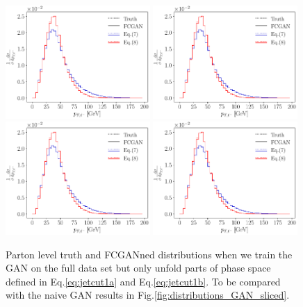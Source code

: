 \begin{figure}[t]
\centering
\includegraphics[page = 2, width=0.49\textwidth]{figures/cGAN/cGAN_overlap_1}
\includegraphics[page = 3, width=0.49\textwidth]{figures/cGAN/cGAN_overlap_1} \\
\includegraphics[page = 1, width=0.49\textwidth]{figures/cGAN/cGAN_overlap_1}
\includegraphics[page = 4, width=0.49\textwidth]{figures/cGAN/cGAN_overlap_1}
\caption{Parton level truth and FCGANned distributions when we train
  the GAN on the full data set but only unfold parts of phase space
  defined in Eq.\eqref{eq:jetcut1a} and Eq.\eqref{eq:jetcut1b}. To be
  compared with the naive GAN results in
  Fig.\ref{fig:distributions_GAN_sliced}.}
\label{fig:distributions_FCGAN_sliced_1}
\end{figure}

